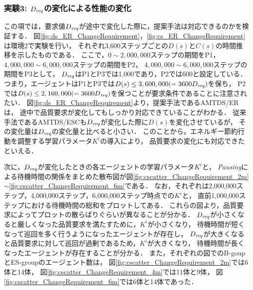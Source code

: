 \documentclass[12pt,a4j,twoside]{jarticle}
\def\Dreq{{D_{\it req}}}
\begin{document}
  
  \subsubsection{実験3: $\Dreq$の変化による性能の変化}\label{ex:ER3}
  この項では，要求値$\Dreq$が途中で変化した際に，提案手法は対応できるのかを検証する．
  図\ref{fig:ds_ER_ChangeRequirement}，\ref{fig:cs_ER_ChangeRequirement}は環境2で実験を行い，
  それぞれ3,600ステップごとの$D(s)$と$C(s)$の時間推移を示したものである．
  ここで，$0 \sim 2,000,000$ステップの期間をP1，$4,000,000 \sim 6,000,000$ステップの期間をP2，
  $4,000,000 \sim 6,000,000$ステップの期間をP3として，
  $\Dreq$はP1とP3では1,000であり，P2では600と設定している．
  つまり，エージェントはP1とP3では$D(s) \leq 3,600,000 (= 3600\Dreq)$を保ち，
  P2では$D(s) \leq 2,160,000 (= 3600\Dreq)$を保つことが要求条件であることに注意されたい．
  図\ref{fig:ds_ER_ChangeRequirement}より，提案手法であるAMTDS/ERは，
  途中で品質要求が変化してもしっかり対応できていることがわかる．
  従来手法であるAMTDS/ESCも$\Dreq$が変化した際に$D(s)$を変化させているが，
  その変化量は$\Dreq$の変化量と比べると小さい．
  このことから，エネルギー節約行動を調整する学習パラメータ$K^i$の導入により，
  品質要求の変化にも対応できたといえる．
  \par

  次に，$\Dreq$が変化したときの各エージェントの学習パラメータ$K^i$と，
  {\em Pausing}による待機時間の関係をまとめた散布図が図\ref{fig:cscatter_ChangeRequirement_2m}
  $\sim$\ref{fig:cscatter_ChangeRequirement_6m}である．
  なお，それぞれは2,000,000ステップ，4,000,000ステップ，6,000,000ステップ時点での$K^i$と，
  直前1,000,000ステップにおける待機時間の総和をプロットしてある．
  これらの図より，品質要求によってプロットの散らばりぐらいが異なることが分かる．
  $\Dreq$が小さくなると厳しくなった品質要求を満たすために，$K^i$が小さくなり，
  待機時間が短くなって巡回を多く行うようになったエージェントが存在し，
  $\Dreq$が大きくなると品質要求に対して巡回が過剰であるため，$K^i$が大きくなり，
  待機時間が長くなったエージェントが存在することが分かる．
  また，それぞれの図でのB-goupとES-groupのエージェント数は，
  図\ref{fig:cscatter_ChangeRequirement_2m}では6体と14体，
  図\ref{fig:cscatter_ChangeRequirement_4m}では11体と9体，
  図\ref{fig:cscatter_ChangeRequirement_6m}では6体と14体であった．
  \par
\end{document}
